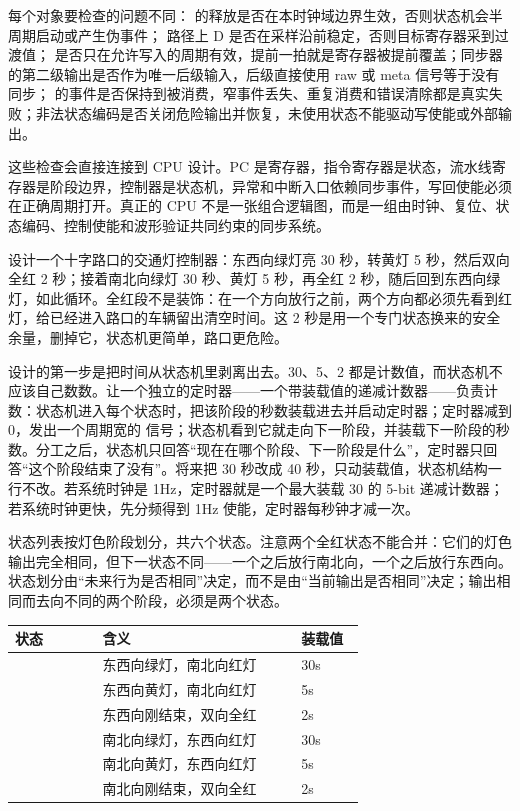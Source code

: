 每个对象要检查的问题不同： 的释放是否在本时钟域边界生效，否则状态机会半周期启动或产生伪事件； 路径上 D 是否在采样沿前稳定，否则目标寄存器采到过渡值； 是否只在允许写入的周期有效，提前一拍就是寄存器被提前覆盖；同步器的第二级输出是否作为唯一后级输入，后级直接使用 raw 或 meta 信号等于没有同步； 的事件是否保持到被消费，窄事件丢失、重复消费和错误清除都是真实失败；非法状态编码是否关闭危险输出并恢复，未使用状态不能驱动写使能或外部输出。

这些检查会直接连接到 CPU 设计。PC 是寄存器，指令寄存器是状态，流水线寄存器是阶段边界，控制器是状态机，异常和中断入口依赖同步事件，写回使能必须在正确周期打开。真正的 CPU 不是一张组合逻辑图，而是一组由时钟、复位、状态编码、控制使能和波形验证共同约束的同步系统。


设计一个十字路口的交通灯控制器：东西向绿灯亮 30 秒，转黄灯 5 秒，然后双向全红 2 秒；接着南北向绿灯 30 秒、黄灯 5 秒，再全红 2 秒，随后回到东西向绿灯，如此循环。全红段不是装饰：在一个方向放行之前，两个方向都必须先看到红灯，给已经进入路口的车辆留出清空时间。这 2 秒是用一个专门状态换来的安全余量，删掉它，状态机更简单，路口更危险。

设计的第一步是把时间从状态机里剥离出去。30、5、2 都是计数值，而状态机不应该自己数数。让一个独立的定时器——一个带装载值的递减计数器——负责计数：状态机进入每个状态时，把该阶段的秒数装载进去并启动定时器；定时器减到 0，发出一个周期宽的  信号；状态机看到它就走向下一阶段，并装载下一阶段的秒数。分工之后，状态机只回答“现在在哪个阶段、下一阶段是什么”，定时器只回答“这个阶段结束了没有”。将来把 30 秒改成 40 秒，只动装载值，状态机结构一行不改。若系统时钟是 1Hz，定时器就是一个最大装载 30 的 5-bit 递减计数器；若系统时钟更快，先分频得到 1Hz 使能，定时器每秒钟才减一次。

状态列表按灯色阶段划分，共六个状态。注意两个全红状态不能合并：它们的灯色输出完全相同，但下一状态不同——一个之后放行南北向，一个之后放行东西向。状态划分由“未来行为是否相同”决定，而不是由“当前输出是否相同”决定；输出相同而去向不同的两个阶段，必须是两个状态。

\begin{longtable}{L{0.22\linewidth}L{0.5\linewidth}L{0.16\linewidth}}
\toprule
状态 & 含义 & 装载值 \\
\midrule
{} & 东西向绿灯，南北向红灯 & 30s \\
 & 东西向黄灯，南北向红灯 & 5s \\
 & 东西向刚结束，双向全红 & 2s \\
 & 南北向绿灯，东西向红灯 & 30s \\
 & 南北向黄灯，东西向红灯 & 5s \\
 & 南北向刚结束，双向全红 & 2s \\
\bottomrule
\end{longtable}

